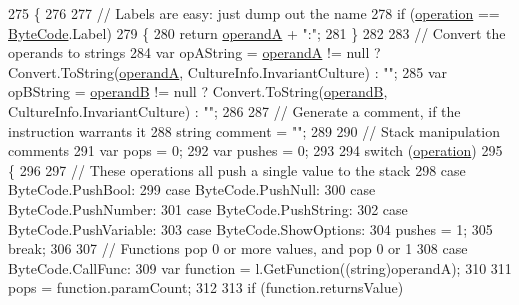 \begin{DoxyCode}
275         \{
276 
277             \textcolor{comment}{// Labels are easy: just dump out the name}
278             \textcolor{keywordflow}{if} (\hyperlink{a00119_a566bf5f7198cc353ea5c3710cb3a31cb}{operation} == \hyperlink{a00051_ad5dfb6ee68ca7469623ad3e459f98894}{ByteCode}.Label)
279             \{
280                 \textcolor{keywordflow}{return} \hyperlink{a00119_ab5d386faa0d3dbc23db80f8e62706afd}{operandA} + \textcolor{stringliteral}{":"};
281             \}
282 
283             \textcolor{comment}{// Convert the operands to strings}
284             var opAString = \hyperlink{a00119_ab5d386faa0d3dbc23db80f8e62706afd}{operandA} != null ? Convert.ToString(\hyperlink{a00119_ab5d386faa0d3dbc23db80f8e62706afd}{operandA}, 
      CultureInfo.InvariantCulture) : \textcolor{stringliteral}{""};
285             var opBString = \hyperlink{a00119_a56348c6fe7eb919b7277afc06e5b224a}{operandB} != null ? Convert.ToString(\hyperlink{a00119_a56348c6fe7eb919b7277afc06e5b224a}{operandB}, 
      CultureInfo.InvariantCulture) : \textcolor{stringliteral}{""};
286 
287             \textcolor{comment}{// Generate a comment, if the instruction warrants it}
288             \textcolor{keywordtype}{string} comment = \textcolor{stringliteral}{""};
289 
290             \textcolor{comment}{// Stack manipulation comments}
291             var pops = 0;
292             var pushes = 0;
293 
294             \textcolor{keywordflow}{switch} (\hyperlink{a00119_a566bf5f7198cc353ea5c3710cb3a31cb}{operation})
295             \{
296 
297                 \textcolor{comment}{// These operations all push a single value to the stack}
298                 \textcolor{keywordflow}{case} ByteCode.PushBool:
299                 \textcolor{keywordflow}{case} ByteCode.PushNull:
300                 \textcolor{keywordflow}{case} ByteCode.PushNumber:
301                 \textcolor{keywordflow}{case} ByteCode.PushString:
302                 \textcolor{keywordflow}{case} ByteCode.PushVariable:
303                 \textcolor{keywordflow}{case} ByteCode.ShowOptions:
304                     pushes = 1;
305                     \textcolor{keywordflow}{break};
306 
307                 \textcolor{comment}{// Functions pop 0 or more values, and pop 0 or 1}
308                 \textcolor{keywordflow}{case} ByteCode.CallFunc:
309                     var \textcolor{keyword}{function} = l.GetFunction((string)operandA);
310 
311                     pops = function.paramCount;
312 
313                     \textcolor{keywordflow}{if} (\textcolor{keyword}{function}.returnsValue)

\end{DoxyCode}
